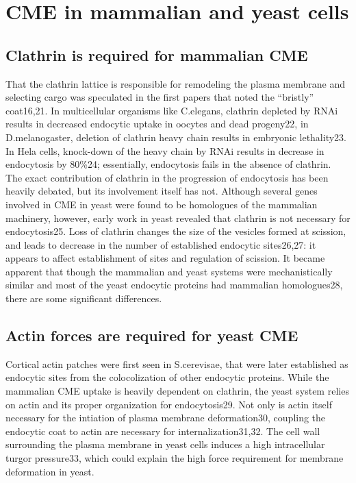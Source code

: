 	
\section{CME in mammalian and yeast cells }
		\subsection{Clathrin is required for mammalian CME}
		That the clathrin lattice is responsible for remodeling the plasma membrane and selecting cargo was speculated in the first papers that noted the “bristly” coat16,21.  In multicellular organisms like C.elegans, clathrin depleted by RNAi results in decreased endocytic uptake in oocytes and dead progeny22, in D.melanogaster, deletion of clathrin heavy chain results in embryonic lethality23. In Hela cells, knock-down of the heavy chain by RNAi results in decrease in endocytosis by 80\%24; essentially, endocytosis fails in the absence of clathrin. The exact contribution of clathrin in the progression of endocytosis has been heavily debated, but its involvement itself has not. Although several genes involved in CME in yeast were found to be homologues of the mammalian machinery, however, early work in yeast revealed that clathrin is not necessary for endocytosis25. Loss of clathrin changes the size of the vesicles formed at scission, and leads to decrease in the number of established endocytic sites26,27: it appears to affect establishment of sites and regulation of scission. It became apparent that though the mammalian and yeast systems were mechanistically similar and most of the yeast endocytic proteins had mammalian homologues28, there are some significant differences.


		\subsection{Actin forces are required for yeast CME}
		Cortical actin patches were first seen in S.cerevisae, that were later established as endocytic sites from the colocolization of other endocytic proteins. While the mammalian CME uptake is heavily dependent on clathrin, the yeast system relies on actin and its proper organization for endocytosis29. Not only is actin itself necessary for the intiation of plasma membrane deformation30, coupling the endocytic coat to actin are necessary for internalization31,32.  The cell wall surrounding the plasma membrane in yeast cells induces a high intracellular turgor pressure33, which could explain the high force requirement for membrane deformation in yeast. 


